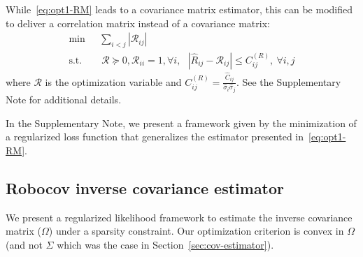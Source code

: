 
While~\eqref{eq:opt1-RM} leads to a covariance matrix estimator, this can be modified to deliver a correlation matrix instead of a covariance matrix: 
\begin{equation}\label{eq:opt1-RM-R}
 \begin{aligned}
    \text{min} ~~~& \sum_{i<j} |\mathcal{R}_{ij}| \\
    \text{s.t.}~~~& ~\mathcal{R} \succeq 0, \mathcal{R}_{ii} = 1, \forall i, ~~~ | \hat{R}_{ij} - \mathcal{R}_{ij} |  \leq  C^{(R)}_{ij}, ~\forall i,j
 \end{aligned}
\end{equation}
where $\mathcal{R}$ is the optimization variable and $C^{(R)}_{ij} = \frac{\hat{C}_{ij}}{\hat{\sigma}_{i} \hat{\sigma}_{j}}$. See the Supplementary Note for additional details. 

In the Supplementary Note, we present a  
framework given by the minimization of a regularized loss function that generalizes the 
estimator presented in~\eqref{eq:opt1-RM}. 

\subsection{Robocov inverse covariance estimator}\label{sec:invcov-estimator}
We present a regularized likelihood framework to estimate the inverse covariance matrix ($\Omega$) under a sparsity constraint.
Our optimization criterion is 
convex in $\Omega$ (and not $\Sigma$ which was the case in Section~\ref{sec:cov-estimator}).


